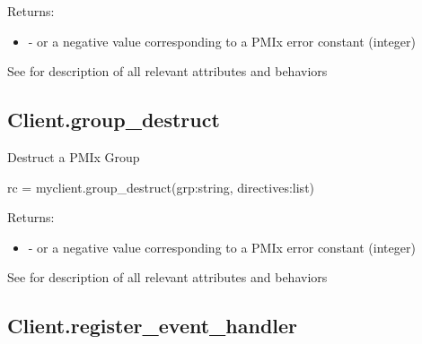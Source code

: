 \begin{arglist}
\end{arglist}

Returns:

\begin{itemize}
    \item {} -  or a negative value corresponding to a PMIx error constant (integer)
\end{itemize}


See  for description of all relevant attributes and behaviors


\subsection{Client.group_destruct}

\summary

Destruct a PMIx Group

\format

\pyspecificstart
\begin{codepar}
rc = myclient.group_destruct(grp:string, directives:list)
\end{codepar}
\pyspecificend

\begin{arglist}
\end{arglist}

Returns:

\begin{itemize}
    \item {} -  or a negative value corresponding to a PMIx error constant (integer)
\end{itemize}


See  for description of all relevant attributes and behaviors


\subsection{Client.register_event_handler}

